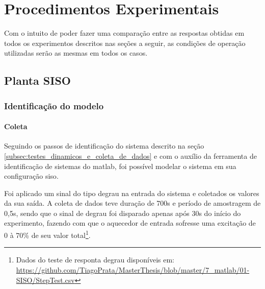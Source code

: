\chapter{Procedimentos Experimentais}
\label{ch:procedimentos_experimentais}

Com o intuito de poder fazer uma comparação entre as respostas obtidas em todos os experimentos
descritos nas seções a seguir, as condições de operação utilizadas serão as mesmas em todos
os casos.

\section{Planta SISO}
\label{sec:planta_siso}

\subsection{Identificação do modelo}
\label{subsec:siso_identificacao_do_modelo}

\subsubsection{Coleta}
\label{subsubsec:siso_identificacao_do_modelo_coleta}

Seguindo os passos de identificação do sistema descrito na seção \ref{subsec:testes_dinamicos_e_coleta_de_dados}
e com o auxílio da ferramenta de identificação de sistemas do \acrshort{matlab}, foi possível modelar
o sistema em sua configuração \acrshort{siso}.

Foi aplicado um sinal do tipo degrau na entrada do sistema e coletados os valores da sua saída.
A coleta de dados teve duração de 700s e período de amostragem de 0,5s, sendo que o sinal de
degrau foi disparado apenas após 30s do início do experimento, fazendo com que o aquecedor de
entrada sofresse uma excitação de 0 à 70\% de seu valor total\footnote{
	Dados do teste de responta degrau disponíveis em:
	\url{https://github.com/TiagoPrata/MasterThesis/blob/master/7_matlab/01-SISO/StepTest.csv}
}.

